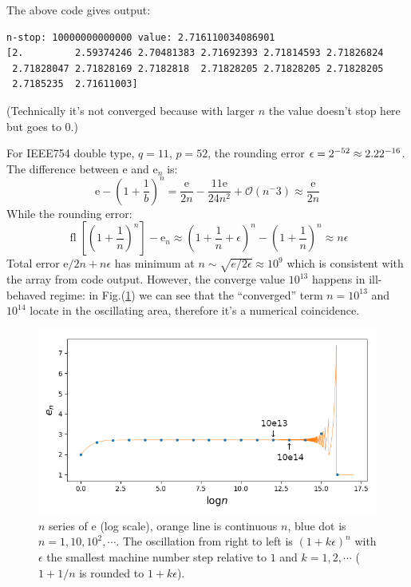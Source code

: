 \documentclass[11pt]{article}
\numberwithin{equation}{section} %
\newcommand\e{\mathrm{e}}
\DeclareMathOperator{\fl}{fl}
\begin{document}
The above code gives output: 
\begin{lstlisting}[numbers=none]
n-stop: 10000000000000 value: 2.716110034086901
[2.         2.59374246 2.70481383 2.71692393 2.71814593 2.71826824
 2.71828047 2.71828169 2.7182818  2.71828205 2.71828205 2.71828205
 2.7185235  2.71611003]
\end{lstlisting}

(Technically it's not converged because with larger $n$ the value doesn't stop 
here but goes to $0$.)


For IEEE754 double type, $q=11$, $p=52$, the rounding error $\epsilon =
2^{-52} \approx 2.22\time 10^{-16}$. The difference between $\e$ and $\e_n$
is: 
\begin{equation}
  \e - \left(1 + \frac 1b\right)^n = \frac{\e}{2n} - \frac{11\e}{24n^2} + 
  \mathcal O(n^-3) \approx \frac{\e}{2n}
\end{equation}
While the rounding error:
\begin{equation}
  \fl\left[\left(1+\frac 1n\right)^n\right] - \e_n
  \approx \left(1+\frac 1n + \epsilon\right)^n - \left(1+\frac 1n\right)^n
  \approx n\epsilon
\end{equation}
Total error $\e/2n + n\epsilon$ has minimum at $n\sim
\sqrt{e/2\epsilon} \approx 10^9$ which is consistent with the array from 
code output. However, the converge value $10^{13}$ happens in ill-behaved
regime: in Fig.(\ref{fig:p5}) we can see that the ``converged'' term $n =
10^{13}$ and $10^{14}$ locate in the oscillating area, therefore it's a
numerical coincidence. 

\begin{figure}[!htp]
  \centering
  \includegraphics[width=\linewidth]{p5.png}
  \caption{$n$ series of $\e$ (log scale), orange line is continuous $n$, 
  blue dot is $n = 1, 10, 10^2, \cdots$.  The oscillation
  from right to left is $(1+k\epsilon)^n$ with $\epsilon$
  the smallest machine number step relative to $1$ and $k = 1, 2, \cdots$ 
  ($1+1/n$ is rounded to $1+k\epsilon$). \label{fig:p5}}
\end{figure}
\end{document}

